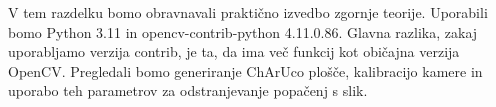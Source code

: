 V tem razdelku bomo obravnavali praktično izvedbo zgornje teorije. Uporabili bomo Python 3.11 in opencv-contrib-python 4.11.0.86. Glavna razlika, zakaj uporabljamo verzija contrib, je ta, da ima več funkcij kot običajna verzija OpenCV. Pregledali bomo generiranje ChArUco plošče, kalibracijo kamere in uporabo teh parametrov za odstranjevanje popačenj s slik.